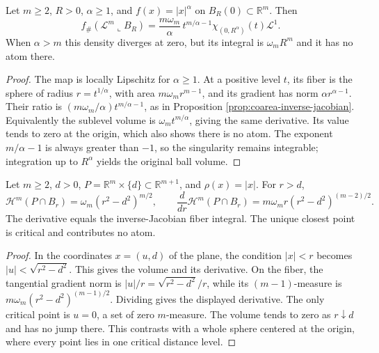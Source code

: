 \begin{example}\label{ex:coarea-radial-power-density}
Let $m\geq2$, $R>0$, $\alpha\geq1$, and $f(x)=|x|^\alpha$ on $B_R(0)\subset\mathbb R^m$. Then
\[
 f_\#(\mathcal L^m\llcorner B_R)
 =\frac{m\omega_m}{\alpha}\,t^{m/\alpha-1}
   \chi_{(0,R^\alpha)}(t)\mathcal L^1.
\]
When $\alpha>m$ this density diverges at zero, but its integral is $\omega_mR^m$ and it has no atom there.
\end{example}
\begin{proof}
The map is locally Lipschitz for $\alpha\geq1$. At a positive level $t$, its fiber is the sphere of radius $r=t^{1/\alpha}$, with area $m\omega_mr^{m-1}$, and its gradient has norm $\alpha r^{\alpha-1}$. Their ratio is $(m\omega_m/\alpha)t^{m/\alpha-1}$, as in Proposition \ref{prop:coarea-inverse-jacobian}. Equivalently the sublevel volume is $\omega_m t^{m/\alpha}$, giving the same derivative. Its value tends to zero at the origin, which also shows there is no atom. The exponent $m/\alpha-1$ is always greater than $-1$, so the singularity remains integrable; integration up to $R^\alpha$ yields the original ball volume.
\end{proof}

\begin{example}\label{ex:coarea-offset-plane-distance}
Let $m\geq2$, $d>0$, $P=\mathbb R^m\times\{d\}\subset\mathbb R^{m+1}$, and $\rho(x)=|x|$. For $r>d$,
\[
 \mathcal H^m(P\cap B_r)=\omega_m(r^2-d^2)^{m/2},
 \qquad
 \frac{d}{dr}\mathcal H^m(P\cap B_r)
 =m\omega_mr(r^2-d^2)^{(m-2)/2}.
\]
The derivative equals the inverse-Jacobian fiber integral. The unique closest point is critical and contributes no atom.
\end{example}
\begin{proof}
In the coordinates $x=(u,d)$ of the plane, the condition $|x|<r$ becomes $|u|<\sqrt{r^2-d^2}$. This gives the volume and its derivative. On the fiber, the tangential gradient norm is $|u|/r=\sqrt{r^2-d^2}/r$, while its $(m-1)$-measure is $m\omega_m(r^2-d^2)^{(m-1)/2}$. Dividing gives the displayed derivative. The only critical point is $u=0$, a set of zero $m$-measure. The volume tends to zero as $r\downarrow d$ and has no jump there. This contrasts with a whole sphere centered at the origin, where every point lies in one critical distance level.
\end{proof}
